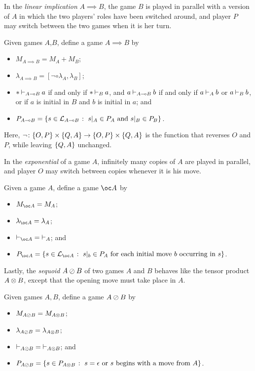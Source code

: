 In the \emph{linear implication} $A\implies B$, the game $B$ is played in parallel with a version of $A$ in which the two players' roles have been switched around, and player $P$ may switch between the two games when it is her turn.

\begin{definition}
  Given games $A$,$B$, define a game $A\implies B$ by
  \begin{itemize}
    \item $M_{A\implies B} = M_A + M_B$;
    \item $\lambda_{A\implies B} = [\neg\circ\lambda_A,\lambda_B]$;
    \item $* \mathbin{\vdash}_{A\multimap B} a$ if and only if $*\mathbin{\vdash}_B a$, and $a \mathbin{\vdash}_{A\multimap B} b$ if and only if $a \mathbin{\vdash}_A b$ or $a\mathbin{\vdash}_B b$, or if $a$ is initial in $B$ and $b$ is initial in $a$; and
    \item $P_{A\multimap B} = \{s\in \mathcal L_{A\multimap B} \;\colon\; \text{$s\vert_A\in P_A$ and $s\vert_B\in P_B$}\}$.
  \end{itemize}
\end{definition}

Here, $\neg\colon \{O,P\}\times\{Q,A\} \to \{O,P\}\times \{Q,A\}$ is the function that reverses $O$ and $P$, while leaving $\{Q,A\}$ unchanged.

In the \emph{exponential} of a game $A$, infinitely many copies of $A$ are played in parallel, and player $O$ may switch between copies whenever it is his move.

\begin{definition}
  Given a game $A$, define a game $\oc A$ by
  \begin{itemize}
    \item $M_{\oc A}=M_A$;
    \item $\lambda_{\oc A} = \lambda_A$;
    \item $\ts_{\oc A} = \ts_A$; and
    \item $P_{\oc A} = \{s\in \L_{\oc A} \suchthat \text{$s\vert_b\in P_A$ for each initial move $b$ occurring in $s$}\}$.
  \end{itemize}
\end{definition}

Lastly, the \emph{sequoid} $A\oslash B$ of two games $A$ and $B$ behaves like the tensor product $A\otimes B$, except that the opening move must take place in $A$.

\begin{definition}
  Given games $A,B$, define a game $A\oslash B$ by
  \begin{itemize}
    \item $M_{A\oslash B} = M_{A\otimes B}$;
    \item $\lambda_{A\oslash B} = \lambda_{A\otimes B}$;
    \item $\mathbin{\vdash}_{A\oslash B} = \mathbin{\vdash}_{A \otimes B}$; and
    \item $P_{A\oslash B} = \{s\in P_{A\otimes B}\;\colon\;\text{$s=\epsilon$ or $s$ begins with a move from $A$}\}$.
  \end{itemize}
\end{definition}

